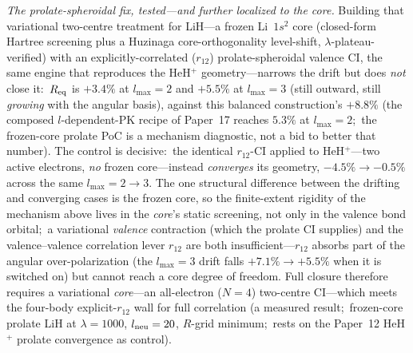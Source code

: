 \documentclass[aps,pra,twocolumn,superscriptaddress,longbibliography]{revtex4-2}
\begin{document}
\emph{The prolate-spheroidal fix, tested---and further localized to the core.}
Building that variational two-centre treatment for LiH---a frozen Li~$1s^2$ core
(closed-form Hartree screening plus a Huzinaga core-orthogonality level-shift,
$\lambda$-plateau-verified) with an explicitly-correlated ($r_{12}$)
prolate-spheroidal valence CI, the same engine that reproduces the HeH$^+$
geometry---narrows the drift but does \emph{not} close it:\ $R_{\rm eq}$ is
$+3.4\%$ at $l_{\max}=2$ and $+5.5\%$ at $l_{\max}=3$ (still outward, still
\emph{growing} with the angular basis), against this balanced construction's
$+8.8\%$ (the composed $l$-dependent-PK recipe of Paper~17 reaches $5.3\%$ at
$l_{\max}=2$;\ the frozen-core prolate PoC is a mechanism diagnostic, not a bid
to better that number).
The control is decisive:\ the identical $r_{12}$-CI applied to HeH$^+$---two
active electrons, \emph{no} frozen core---instead \emph{converges} its geometry,
$-4.5\%\to-0.5\%$ across the same $l_{\max}=2\to3$.  The one structural
difference between the drifting and converging cases is the frozen core, so the
finite-extent rigidity of the mechanism above lives in the \emph{core}'s static
screening, not only in the valence bond orbital;\ a variational \emph{valence}
contraction (which the prolate CI supplies) and the valence--valence correlation
lever $r_{12}$ are both insufficient---$r_{12}$ absorbs part of the angular
over-polarization (the $l_{\max}=3$ drift falls $+7.1\%\to+5.5\%$ when it is
switched on) but cannot reach a core degree of freedom.  Full closure therefore
requires a variational \emph{core}---an all-electron ($N=4$) two-centre
CI---which meets the four-body explicit-$r_{12}$ wall for full correlation
(a measured result;\ frozen-core prolate LiH at $\lambda=1000$, $l_{\rm neu}=20$,
$R$-grid minimum;\ rests on the Paper~12 HeH$^+$ prolate convergence as control).
\end{document}
